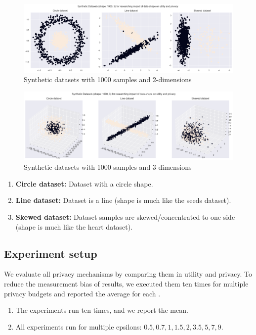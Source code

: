 \begin{figure}[H]
  \includegraphics[width=1.0\textwidth]{Method/images/rq3.png}
  \caption{Synthetic datasets with 1000 samples and 2-dimensions}
  \label{rq3:synthetic-datasets}
\end{figure}
\begin{figure}[H]
  \includegraphics[width=1.0\textwidth]{Method/images/rq3-3d-synth.png}
  \caption{Synthetic datasets with 1000 samples and 3-dimensions}
  \label{rq3:synthetic-datasets-3d}
\end{figure}

\begin{enumerate}
  \item \textbf{Circle dataset:} Dataset with a circle shape.
  \item \textbf{Line dataset:} Dataset is a line (shape is much like the seeds dataset).
  \item \textbf{Skewed dataset:} Dataset samples are skewed/concentrated to one side (shape is much like the heart dataset).
\end{enumerate}

\subsection{Experiment setup}
We evaluate all privacy mechanisms by comparing them in utility and privacy.
To reduce the measurement bias of results, we executed them ten times for multiple privacy budgets and reported the average for each \citep{9679364}.
\begin{enumerate}
  \item The experiments run ten times, and we report the mean.
  \item All experiments run for multiple epsilons: ${0.5, 0.7, 1, 1.5, 2, 3.5, 5, 7, 9}$.
\end{enumerate}
\newpage

